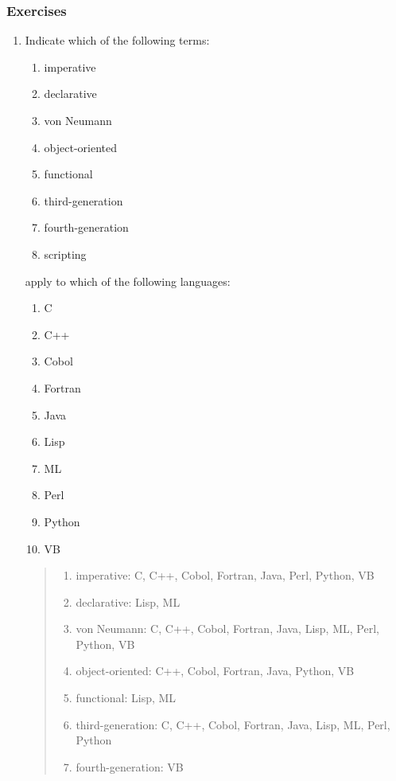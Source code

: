 \documentclass[titlepage]{article}
\begin{document}
\subsubsection*{Exercises}
\begin{enumerate}
    \item Indicate which of the following terms:
          \begin{multicols}{3}
              \begin{enumerate}[label=(\alph*)]
                  \item imperative
                  \item declarative
                  \item von Neumann
                  \item object-oriented
                  \item functional
                  \item third-generation
                  \item fourth-generation
                  \item scripting
              \end{enumerate}
          \end{multicols}
          apply to which of the following languages:
          \begin{multicols}{5}
              \begin{enumerate}[label=(\arabic*)]
                  \item C
                  \item C++
                  \item Cobol
                  \item Fortran
                  \item Java
                  \item Lisp
                  \item ML
                  \item Perl
                  \item Python
                  \item VB
              \end{enumerate}
          \end{multicols}
          \begin{quote}
              \begin{enumerate}[label=(\alph*)]
                  \item imperative: C, C++, Cobol, Fortran, Java, Perl, Python, VB
                  \item declarative: Lisp, ML
                  \item von Neumann: C, C++, Cobol, Fortran, Java, Lisp, ML, Perl, Python, VB
                  \item object-oriented: C++, Cobol, Fortran, Java, Python, VB
                  \item functional: Lisp, ML
                  \item third-generation: C, C++, Cobol, Fortran, Java, Lisp, ML, Perl, Python
                  \item fourth-generation: VB
              \end{enumerate}
          \end{quote}
\end{enumerate}
\end{document}
